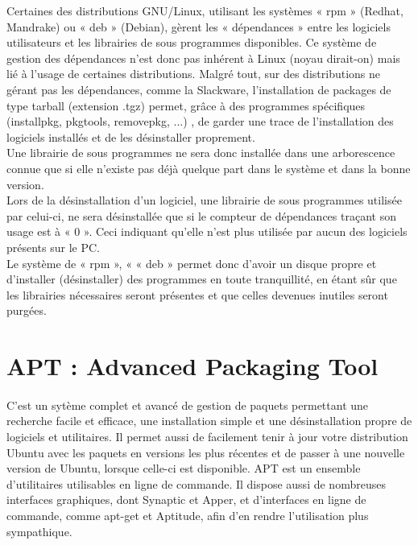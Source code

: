 \documentclass[a4paper,12pt]{article}
\begin{document}
Certaines des distributions GNU/Linux, utilisant les systèmes « rpm » (Redhat, Mandrake) ou « deb » (Debian), gèrent 
les « dépendances » entre les logiciels utilisateurs et les librairies de sous programmes disponibles. 
Ce système de gestion des dépendances n’est donc pas inhérent à Linux (noyau dirait-on) mais lié à l’usage de certaines distributions. 
Malgré tout, sur des distributions ne gérant pas les dépendances, comme la Slackware, l’installation de packages de type tarball (extension .tgz)
permet, grâce à des programmes spécifiques (installpkg, pkgtools, removepkg, ...) , de garder une trace de l’installation des logiciels installés 
et de les désinstaller proprement.\\

Une librairie de sous programmes ne sera donc installée dans une arborescence connue que si elle n’existe pas déjà quelque part dans le système et dans la bonne version.\\

Lors de la désinstallation d’un logiciel, une librairie de sous programmes utilisée par celui-ci, ne sera désinstallée que si le compteur de 
dépendances traçant son usage est à « 0 ». Ceci indiquant qu’elle n’est plus utilisée par aucun des logiciels présents sur le PC.\\

Le système de « rpm », « « deb » permet donc d’avoir un disque propre et d’installer (désinstaller) des programmes en toute tranquillité, 
en étant sûr que les librairies nécessaires seront présentes et que celles devenues inutiles seront purgées.


\section{APT : Advanced Packaging Tool}
\paragraph{}
C'est un sytème complet et avancé de gestion de paquets permettant une recherche facile et efficace, une installation simple et une désinstallation propre de logiciels et utilitaires. 
Il permet aussi de facilement tenir à jour votre distribution Ubuntu avec les paquets en versions les plus récentes et de passer à une nouvelle version de Ubuntu, lorsque celle-ci est disponible.
APT est un ensemble d'utilitaires utilisables en ligne de commande. Il dispose aussi de nombreuses interfaces graphiques, dont Synaptic et Apper, et d'interfaces en ligne de commande, comme apt-get 
et Aptitude, afin d'en rendre l'utilisation plus sympathique.
\end{document}
